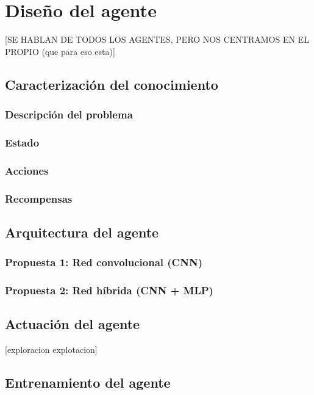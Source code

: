 \chapter{Diseño del agente}

[SE HABLAN DE TODOS LOS AGENTES, PERO NOS CENTRAMOS EN EL PROPIO (que para eso esta)]

\section{Caracterización del conocimiento}

\subsection{Descripción del problema}

\subsection{Estado}

\subsection{Acciones}

\subsection{Recompensas}
 
\section{Arquitectura del agente}

\subsection{Propuesta 1: Red convolucional (CNN)}

\subsection{Propuesta 2: Red híbrida (CNN + MLP)}

\section{Actuación del agente}
[exploracion explotacion]

\section{Entrenamiento del agente}

